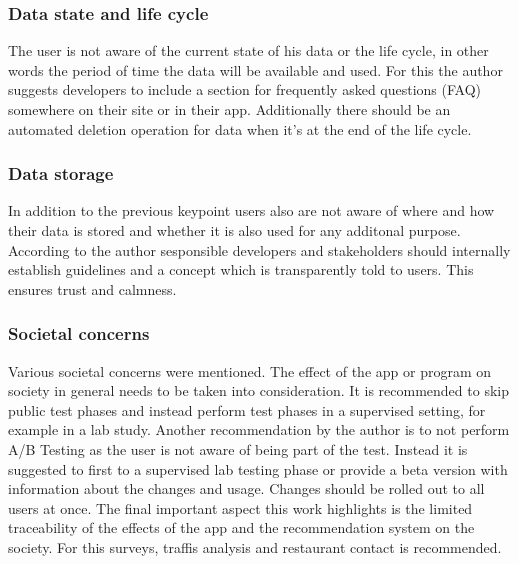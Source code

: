 \documentclass[runningheads,a4paper]{llncs}
\begin{document}
\subsubsection{Data state and life cycle}
The user is not aware of the current state of his data or the life cycle, in other words the period of time the data will be available and used. 
For this the author suggests developers to include a section for frequently asked questions (FAQ) somewhere on their site or in their app.
Additionally there should be an automated deletion operation for data when it's at the end of the life cycle. 
\subsubsection{Data storage}
In addition to the previous keypoint users also are not aware of where and how their data is stored and whether it is also used for any additonal purpose. 
According to the author sesponsible developers and stakeholders should internally establish guidelines and a concept which is transparently told to users. 
This ensures trust and calmness. 
\subsubsection{Societal concerns}
Various societal concerns were mentioned. 
The effect of the app or program on society in general needs to be taken into consideration. 
It is recommended to skip public test phases and instead perform test phases in a supervised setting, for example in a lab study.
Another recommendation by the author is to not perform A/B Testing as the user is not aware of being part of the test. 
Instead it is suggested to first to a supervised lab testing phase or provide a beta version with information about the changes and usage.
Changes should be rolled out to all users at once. 
The final important aspect this work highlights is the limited traceability of the effects of the app and the recommendation system on the society.
For this surveys, traffis analysis and restaurant contact is recommended.  \cite{levina2021towards} 
\end{document}
